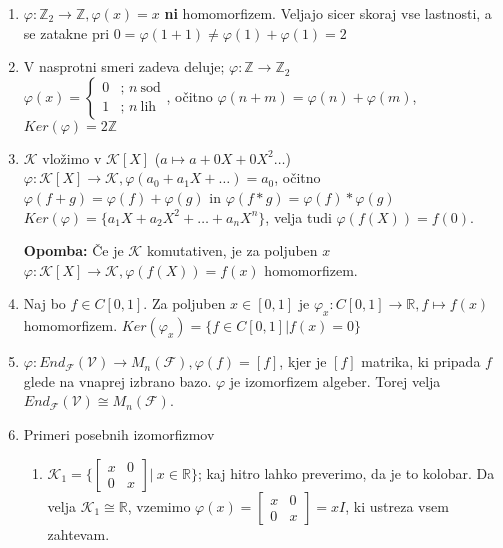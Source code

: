 \documentclass[a4paper]{article}
\newcounter{environment:definition_counter}
\newcounter{environment:theorem_counter}
\newcounter{environment:statement_counter}
\newenvironment{remark}
{\textbf{Opomba:}}
{}
\newcommand{\twopartdef}[4]
{
	\left\{
		\begin{array}{ll}
			#1 & \mbox{; } #2 \\
			#3 & \mbox{; } #4
		\end{array}
	\right.
}
\begin{document}
\begin{enumerate}
\item
$\varphi : \mathbb{Z}_2 \to \mathbb{Z}, \varphi(x) = x$ \textbf{ni} homomorfizem. Veljajo sicer skoraj vse lastnosti, a se zatakne pri $0 = \varphi(1+1) \neq \varphi(1) + \varphi(1) = 2$
\item 
V nasprotni smeri zadeva deluje;
$\varphi : \mathbb{Z} \to \mathbb{Z}_2$\\
$\varphi(x) =\twopartdef{0}{n \ \text{sod}}{1}{n \ \text{lih}}$, očitno $\varphi(n+m) = \varphi(n) + \varphi(m)$, $Ker(\varphi) = 2\mathbb{Z}$

\item
$\mathcal{K}$ vložimo v $\mathcal{K}[X]$ ($a \mapsto a + 0X + 0X^2 \dots$)\\
$\varphi: \mathcal{K}[X] \to \mathcal{K}, \varphi(a_0 + a_1X + \dots) = a_0$, očitno $\varphi(f+g) = \varphi(f) + \varphi(g)$ in $\varphi(f*g) = \varphi(f) * \varphi(g)$ \\
$Ker(\varphi) = \{a_1X + a_2X^2 + \dots + a_nX^n\}$, velja tudi $\varphi(f(X)) = f(0)$.

\begin{remark}
Če je $\mathcal{K}$ komutativen, je za poljuben $x$ $\varphi: \mathcal{K}[X] \to \mathcal{K}, \varphi(f(X)) = f(x)$ homomorfizem.
\end{remark}

\item Naj bo $f \in C[0,1]$. Za poljuben $x \in [0,1]$ je $\varphi_x : C[0,1] \to \mathbb{R}, f \mapsto f(x) $ homomorfizem. $Ker(\varphi_x) = \{f \in C[0,1] | f(x) = 0\}$

\item $\varphi: End_{\mathcal{F}}(\mathcal{V}) \to M_n(\mathcal{F}), \varphi(f) = [f]$, kjer je $[f]$ matrika, ki pripada $f$ glede na vnaprej izbrano bazo. $\varphi$ je izomorfizem algeber. Torej velja $  End_{\mathcal{F}}(\mathcal{V}) \cong M_n(\mathcal{F})$.

\item
Primeri posebnih izomorfizmov
\begin{enumerate}
\item $\mathcal{K}_1 = \{ \begin{bmatrix}
		x & 0 \\
		0 & x
	  \end{bmatrix} | \ x \in \mathbb{R}\}$; kaj hitro lahko preverimo, da je to kolobar. Da velja $\mathcal{K}_1 \cong \mathbb{R}$, vzemimo $\varphi(x) = \begin{bmatrix}
		x & 0 \\
		0 & x
	  \end{bmatrix} = xI$, ki ustreza vsem zahtevam.
	  

\end{enumerate}
\end{enumerate}
\end{document}
